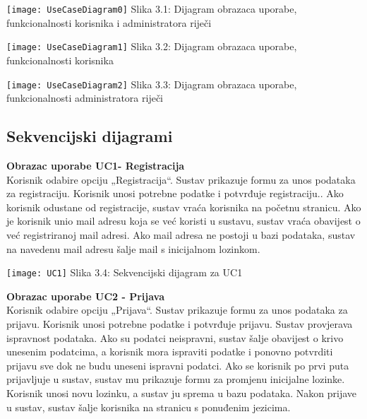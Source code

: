 
					\texttt{[image: UseCaseDiagram0]}
					Slika 3.1: Dijagram obrazaca uporabe, funkcionalnosti korisnika i administratora riječi
					
					\texttt{[image: UseCaseDiagram1]}
					Slika 3.2: Dijagram obrazaca uporabe, funkcionalnosti korisnika
					
					\texttt{[image: UseCaseDiagram2]}
					Slika 3.3: Dijagram obrazaca uporabe, funkcionalnosti administratora riječi\newpage
				
			\subsection{Sekvencijski dijagrami}
				
%				
				
				\textbf{Obrazac uporabe UC1- Registracija}\\
				Korisnik odabire opciju „Registracija“. Sustav prikazuje formu za unos podataka za registraciju. Korisnik unosi potrebne podatke i potvrđuje registraciju.. Ako korisnik odustane od registracije, sustav vraća korisnika na početnu stranicu. Ako je korisnik unio mail adresu koja se već koristi u sustavu, sustav vraća obavijest o već registriranoj mail adresi. Ako mail adresa ne postoji u bazi podataka, sustav na navedenu mail adresu šalje mail s inicijalnom lozinkom.\newpage

				\texttt{[image: UC1]}
				Slika 3.4: Sekvencijski dijagram za UC1\newpage
				
				
				\noindent\textbf{Obrazac uporabe UC2 - Prijava}\\
				Korisnik odabire opciju „Prijava“. Sustav prikazuje formu za unos podataka za prijavu. Korisnik unosi potrebne podatke i potvrđuje prijavu. Sustav provjerava ispravnost podataka. Ako su podatci neispravni, sustav šalje obavijest o krivo unesenim podatcima, a korisnik mora ispraviti podatke i ponovno potvrditi prijavu sve dok ne budu uneseni ispravni podatci. Ako se korisnik po prvi puta prijavljuje u sustav, sustav mu prikazuje formu za promjenu inicijalne lozinke. Korisnik unosi novu lozinku, a sustav ju sprema u bazu podataka. Nakon prijave u sustav, sustav šalje korisnika na stranicu s ponuđenim jezicima.
				

